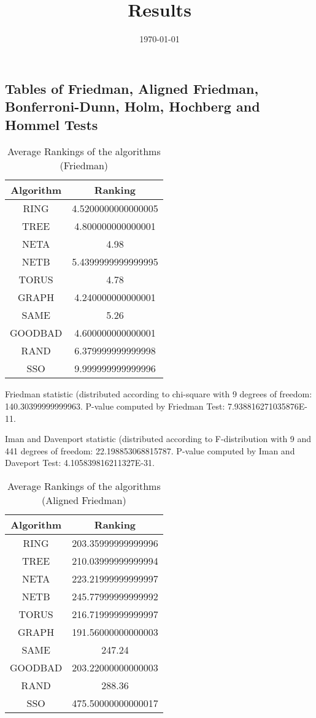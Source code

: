\documentclass[a4paper,10pt]{article}
\title{Results}
\author{}
\date{\today}
\begin{document}
\begin{landscape}
\oddsidemargin 0in \topmargin 0in\maketitle
\section{Tables of Friedman, Aligned Friedman, Bonferroni-Dunn, Holm, Hochberg and Hommel Tests}
\begin{table}[!htp]
\centering
\caption{Average Rankings of the algorithms (Friedman)
}\begin{tabular}{c|c}
Algorithm&Ranking\\
\hline
 RING&4.5200000000000005\\
 TREE&4.800000000000001\\
 NETA&4.98\\
 NETB&5.4399999999999995\\
 TORUS&4.78\\
 GRAPH&4.240000000000001\\
 SAME&5.26\\
 GOODBAD&4.600000000000001\\
 RAND&6.379999999999998\\
 SSO&9.999999999999996\\
\end{tabular}
\end{table}


Friedman statistic (distributed according to chi-square with 9 degrees of freedom: 140.30399999999963. 
P-value computed by Friedman Test: 7.938816271035876E-11.\newline

Iman and Davenport statistic (distributed according to F-distribution with 9 and 441 degrees of freedom: 22.198853068815787. 
P-value computed by Iman and Daveport Test: 4.105839816211327E-31.\newline


\newpage

\begin{table}[!htp]
\centering
\caption{Average Rankings of the algorithms (Aligned Friedman)
}\begin{tabular}{c|c}
Algorithm&Ranking\\
\hline
 RING&203.35999999999996\\
 TREE&210.03999999999994\\
 NETA&223.21999999999997\\
 NETB&245.77999999999992\\
 TORUS&216.71999999999997\\
 GRAPH&191.56000000000003\\
 SAME&247.24\\
 GOODBAD&203.22000000000003\\
 RAND&288.36\\
 SSO&475.50000000000017\\
\end{tabular}
\end{table}



\end{landscape}
\end{document}
